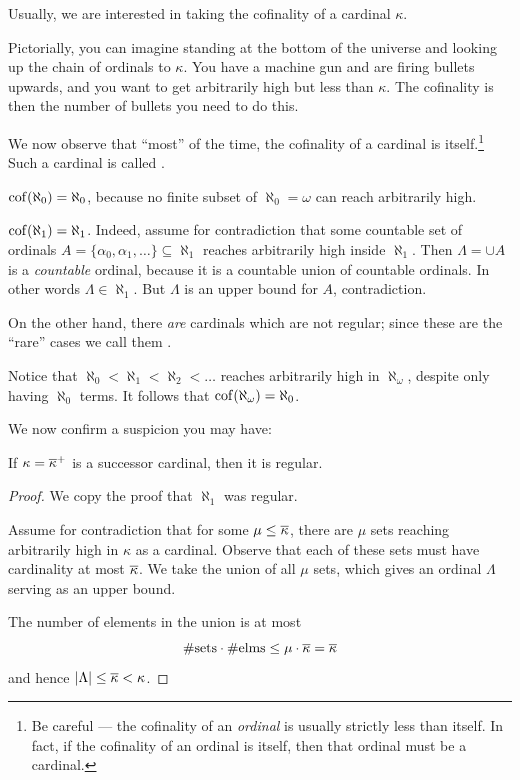 Usually, we are interested in taking the cofinality of a cardinal $\kappa$.

Pictorially, you can imagine standing at the bottom of the universe and looking
up the chain of ordinals to $\kappa$.
You have a machine gun and are firing bullets upwards, and you want to get arbitrarily
high but less than $\kappa$.
The cofinality is then the number of bullets you need to do this.

We now observe that ``most'' of the time, the cofinality of a cardinal is itself.\footnote{Be
careful --- the cofinality of an \emph{ordinal} is usually strictly less than itself.
In fact, if the cofinality of an ordinal is itself, then that ordinal must be a cardinal.}
Such a cardinal is called .
\begin{example}
	$\operatorname{cof}(\aleph_0) = \aleph_0$, because no finite subset of
	$\aleph_0 = \omega$ can reach arbitrarily high.
\end{example}
\begin{example}
	$\operatorname{cof}(\aleph_1) = \aleph_1$.
	Indeed, assume for contradiction that some countable
	set of ordinals $A = \{ \alpha_0, \alpha_1, \dots \} \subseteq \aleph_1$
	reaches arbitrarily high inside $\aleph_1$.
	Then $\Lambda = \cup A$ is a \emph{countable} ordinal,
	because it is a countable union of countable ordinals.
	In other words $\Lambda \in \aleph_1$.
	But $\Lambda$ is an upper bound for $A$, contradiction.
\end{example}
On the other hand, there \emph{are} cardinals which are not regular;
since these are the ``rare'' cases we call them .
\begin{example}
	Notice that $\aleph_0 < \aleph_1 < \aleph_2 < \dots$ reaches
	arbitrarily high in $\aleph_\omega$, despite only having $\aleph_0$ terms.
	It follows that $\operatorname{cof}(\aleph_\omega) = \aleph_0$.
\end{example}

We now confirm a suspicion you may have:
\begin{theorem}
	If $\kappa = \overline\kappa^+$ is a successor cardinal,
	then it is regular.
\end{theorem}
\begin{proof}
	We copy the proof that $\aleph_1$ was regular.

	Assume for contradiction that for some $\mu \le \overline\kappa$,
	there are $\mu$ sets reaching arbitrarily high in $\kappa$ as a cardinal.
	Observe that each of these sets must have cardinality at most $\overline\kappa$.
	We take the union of all $\mu$ sets, which gives an ordinal $\Lambda$
	serving as an upper bound.

	The number of elements in the union is at most
	\[ \#\text{sets} \cdot \#\text{elms}
		\le \mu \cdot \overline\kappa = \overline\kappa \]
	and hence $\left\lvert \Lambda \right\rvert \le \overline\kappa < \kappa$.
\end{proof}

